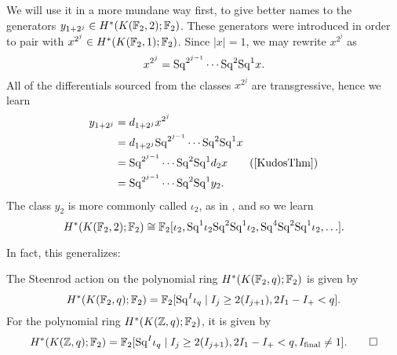 \begin{example}
We will use it in a more mundane way first, to give better names to the generators $y_{1+2^j} \in H^*(K(\mathbb F_2, 2); \mathbb F_2)$.
These generators were introduced in order to pair with $x^{2^j} \in H^*(K(\mathbb F_2, 1); \mathbb F_2)$.
Since $|x| = 1$, we may rewrite $x^{2^j}$ as \[x^{2^j} = \mathrm{Sq}^{2^{j-1}} \cdots \mathrm{Sq}^2 \mathrm{Sq}^1 x.\]
All of the differentials sourced from the classes $x^{2^j}$ are transgressive, hence we learn
\begin{align*}
y_{1+2^j} & = d_{1+2^j} x^{2^j} \\
& = d_{1+2^j} \Sq^{2^{j-1}} \cdots \Sq^2 \Sq^1 x \\
& = \Sq^{2^{j-1}} \cdots \Sq^2 \Sq^1 d_2 x \tag{\Cref{KudosThm}} \\
& = \Sq^{2^{j-1}} \cdots \Sq^2 \Sq^1 y_2.
\end{align*}
The class $y_2$ is more commonly called $\iota_2$, as in , and so we learn \[H^*(K(\mathbb F_2, 2); \mathbb F_2) \cong \mathbb F_2[\iota_2, \mathrm{Sq}^1 \iota_2 \mathrm{Sq}^2 \mathrm{Sq}^1 \iota_2, \mathrm{Sq}^4 \mathrm{Sq}^2 \mathrm{Sq}^1 \iota_2, \ldots].\]
\end{example}

In fact, this generalizes:

\begin{theorem}\label{EMCohAsASteenrodAlg}
The Steenrod action on the polynomial ring $H^*(K(\mathbb F_2, q); \mathbb F_2)$ is given by \[H^*(K(\mathbb F_2, q); \mathbb F_2) = \mathbb F_2[\mathrm{Sq}^I \iota_q \mid I_j \ge 2(I_{j+1}), 2I_1 - I_+ < q].\]
For the polynomial ring $H^*(K(\mathbb Z, q); \mathbb F_2)$, it is given by \[H^*(K(\mathbb Z, q); \mathbb F_2) = \mathbb F_2[\mathrm{Sq}^I \iota_q \mid I_j \ge 2(I_{j+1}), 2I_1 - I_+ < q, I_{\text{final}} \ne 1]. \qed\]
\end{theorem}




